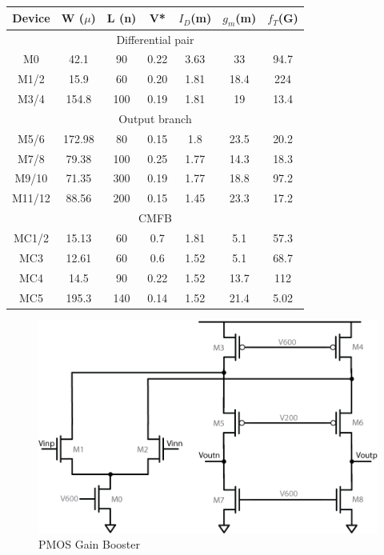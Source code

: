 \documentclass[conference]{IEEEtran}
\begin{document}
\begin{center}
\begin{tabular}{|c|c|c|c|c|c|c|} 
\hline
Device & W ($\mu$) & L (n) & V* & $I_D$(m) & $g_m$(m) & $f_T$(G) \\
\hline
\multicolumn{7}{|c|}{Differential pair} \\
\hline
M0 &	 42.1 & 90 & 0.22 & 3.63 & 33 & 94.7 \\
\hline
M1/2 &  15.9 & 60 & 0.20 & 1.81 & 18.4 & 224 \\
\hline
M3/4 & 154.8 & 100 & 0.19 & 1.81 & 19 & 13.4 \\
\hline
\multicolumn{7}{|c|}{Output branch} \\
\hline
M5/6 & 172.98 & 80 & 0.15 & 1.8 & 23.5 & 20.2 \\
\hline
M7/8 & 79.38 & 100 & 0.25 & 1.77 & 14.3 & 18.3 \\
\hline
M9/10 & 71.35 & 300 & 0.19 & 1.77 & 18.8 & 97.2 \\
\hline
M11/12 & 88.56 & 200 & 0.15 & 1.45 & 23.3 & 17.2 \\ %
\hline
\multicolumn{7}{|c|}{CMFB} \\
\hline
MC1/2 & 15.13 & 60 & 0.7 & 1.81 & 5.1 & 57.3 \\
\hline
MC3 & 12.61 & 60 & 0.6 & 1.52 & 5.1 & 68.7 \\
\hline
MC4 & 14.5 & 90 & 0.22 & 1.52 & 13.7 & 112 \\
\hline
MC5 & 195.3 & 140 & 0.14 & 1.52 & 21.4 & 5.02 \\
\hline
\end{tabular}
\end{center}


\begin{figure}[h]
\centering
\includegraphics[width=0.75\linewidth]{illus/pmos_boost}
\caption{PMOS Gain Booster}
\label{fig:pmos_boost}
\end{figure}
\end{document}

